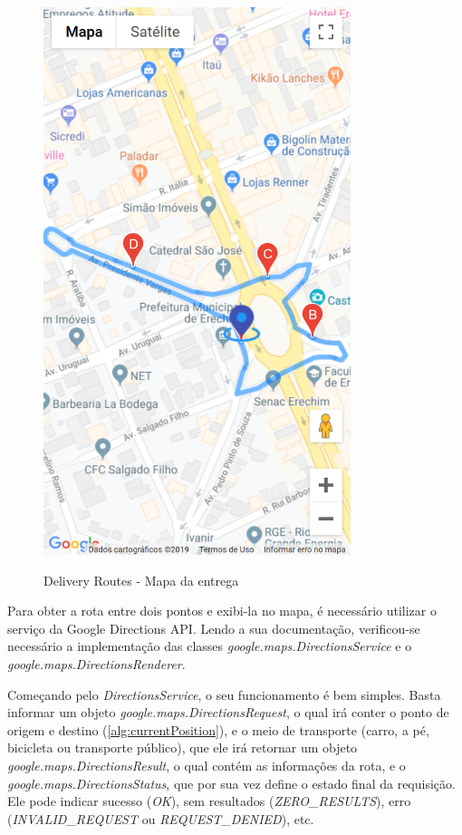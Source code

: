 \newpage
\begin{figure}[H]
    \centering
    \caption{Delivery Routes - Mapa da entrega}
    \includegraphics[width=0.8\textwidth]{./dados/figuras/fig27}
    \label{fig:drRotaEntrega}
\end{figure}

\newpage
Para obter a rota entre dois pontos e exibi-la no mapa, é necessário utilizar o serviço da Google Directions API. Lendo a sua documentação, verificou-se necessário a implementação das classes \textit{google.maps.DirectionsService} e o \textit{google.maps.DirectionsRenderer}.

Começando pelo \textit{DirectionsService}, o seu funcionamento é bem simples. Basta informar um objeto \textit{google.maps.DirectionsRequest}, o qual irá conter o ponto de origem e destino (\autoref{alg:currentPosition}), e o meio de transporte (carro, a pé, bicicleta ou transporte público), que ele irá retornar um objeto \textit{google.maps.DirectionsResult}, o qual contém as informações da rota, e o \textit{google.maps.DirectionsStatus}, que por sua vez define o estado final da requisição. Ele pode indicar sucesso (\textit{OK}), sem resultados (\textit{ZERO\_RESULTS}), erro (\textit{INVALID\_REQUEST} ou \textit{REQUEST\_DENIED}), etc.

